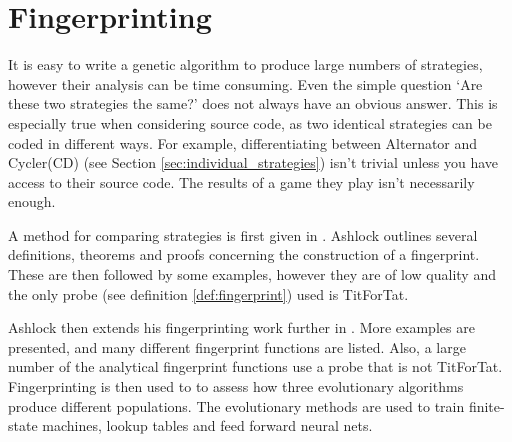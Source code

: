 
\section{Fingerprinting}\label{sec:fingerprinting}
It is easy to write a genetic algorithm to produce large numbers of strategies, however their analysis can be time consuming.
Even the simple question `Are these two strategies the same?' does not always have an obvious answer.
This is especially true when considering source code, as two identical strategies can be coded in different ways.
For example, differentiating between Alternator and Cycler(CD) (see Section \ref{sec:individual_strategies}) isn't trivial unless you have access to their source code.
The results of a game they play isn't necessarily enough.

A method for comparing strategies is first given in \cite{Ashlock2004}.
Ashlock outlines several definitions, theorems and proofs concerning the construction of a fingerprint.
These are then followed by some examples, however they are of low quality and the only probe (see definition \ref{def:fingerprint}) used is TitForTat.

Ashlock then extends his fingerprinting work further in \cite{Ashlock2008}.
More examples are presented, and many different fingerprint functions are listed.
Also, a large number of the analytical fingerprint functions use a probe that is not TitForTat.
Fingerprinting is then used to to assess how three evolutionary algorithms produce different populations.
The evolutionary methods are used to train finite-state machines, lookup tables and feed forward neural nets.

